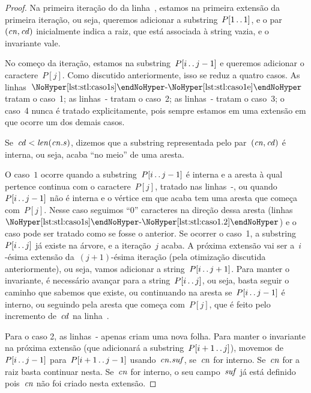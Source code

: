 \begin{proof}
Na primeira iteração do  da linha~, estamos na primeira extensão da primeira iteração, ou seja, queremos adicionar a substring~$P[1\,.\,.\, 1]$, e o par~$(\mathit{cn}, \mathit{cd})$ inicialmente indica a raiz, que está associada à string vazia, e o invariante vale.

No começo da iteração, estamos na substring~$P[i\,.\,.\, j-1]$ e queremos adicionar o caractere~$P[j]$. Como discutido anteriormente, isso se reduz a quatro casos. As linhas~${\nref{lst:stl:caso1s}\text{-}\nref{lst:stl:caso1e}}$ tratam o caso~1; as linhas~- tratam o caso~2; as linhas~- tratam o caso~3; o caso~4 nunca é tratado explicitamente, pois sempre estamos em uma extensão em que ocorre um dos demais casos.

Se~$\mathit{cd} < \mathit{len}(\mathit{cn}.s)$, dizemos que a substring representada pelo par~$(\mathit{cn}, \mathit{cd})$ é interna, ou seja, acaba ``no meio'' de uma aresta.

O caso~$1$ ocorre quando a substring~$P[i\,.\,.\, j - 1]$ é interna e a aresta à qual pertence continua com o caractere~$P[j]$, tratado nas linhas~-, ou quando~$P[i\,.\,.\, j - 1]$ não é interna e o vértice em que acaba tem uma aresta que começa com~$P[j]$. Nesse caso seguimos ``0'' caracteres na direção dessa aresta (linhas~${\nref{lst:stl:caso1s}\text{-}\nref{lst:stl:caso1.2}}$) e o caso pode ser tratado como se fosse o anterior. Se ocorrer o caso~1, a substring~$P[i\,.\,.\, j]$ já existe na árvore, e a iteração~$j$ acaba. A próxima extensão vai ser a~$i$-ésima extensão da~$(j+1)$-ésima iteração (pela otimização discutida anteriormente), ou seja, vamos adicionar a string~$P[i\,.\,.\, j+1]$. Para manter o invariante, é necessário avançar para a string~$P[i\,.\,.\, j]$, ou seja, basta seguir o caminho que sabemos que existe, ou continuando na aresta se~$P[i\,.\,.\, j-1]$ é interno, ou seguindo pela aresta que começa com~$P[j]$, que é feito pelo incremento de~$\mathit{cd}$ na linha~.

Para o caso 2, as linhas~- apenas criam uma nova folha. Para manter o invariante na próxima extensão (que adicionará a substring~$P[i+1\,.\,.\, j]$), movemos de~$P[i\,.\,.\, j-1]$ para~$P[i+1\,.\,.\, j-1]$ usando~$\mathit{cn}.\mathit{suf}$, se~$\mathit{cn}$ for interno. Se~$\mathit{cn}$ for a raiz basta continuar nesta. Se~$\mathit{cn}$ for interno, o seu campo~$\mathit{suf}$ já está definido pois~$\mathit{cn}$ não foi criado nesta extensão.


\end{proof}
